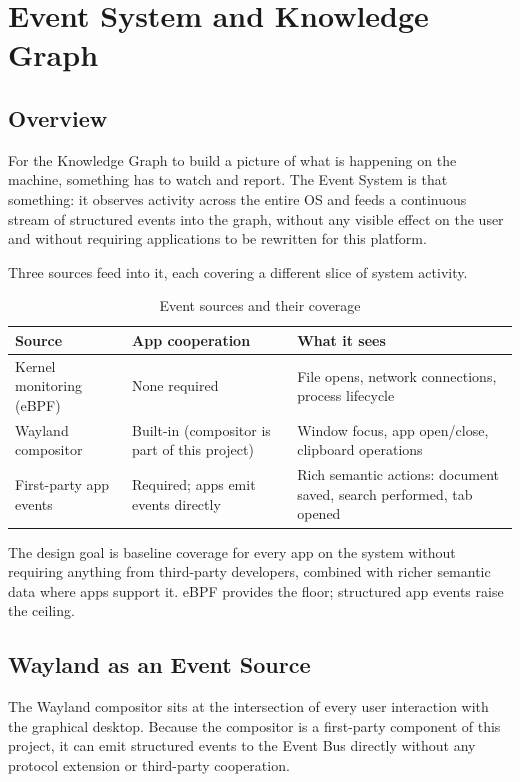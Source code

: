 \section{Event System and Knowledge Graph}
\label{sec:event-knowledge}

\subsection{Overview}
\label{sec:event-overview}

For the Knowledge Graph to build a picture of what is happening on the machine,
something has to watch and report. The Event System is that something: it
observes activity across the entire OS and feeds a continuous stream of
structured events into the graph, without any visible effect on the user and
without requiring applications to be rewritten for this platform.

Three sources feed into it, each covering a different slice of system activity.

\begin{table}[htbp]
\caption{Event sources and their coverage}
\label{tab:event-sources}
\begin{tabularx}{\linewidth}{lXX}
\toprule
\textbf{Source} & \textbf{App cooperation} & \textbf{What it sees} \\
\midrule
Kernel monitoring (eBPF) &
  None required &
  File opens, network connections, process lifecycle \\
Wayland compositor &
  Built-in (compositor is part of this project) &
  Window focus, app open/close, clipboard operations \\
First-party app events &
  Required; apps emit events directly &
  Rich semantic actions: document saved, search performed, tab opened \\
\bottomrule
\end{tabularx}
\end{table}

The design goal is baseline coverage for every app on the system without
requiring anything from third-party developers, combined with richer semantic
data where apps support it. eBPF provides the floor; structured app events
raise the ceiling.

\subsection{Wayland as an Event Source}
\label{sec:wayland-events}

The Wayland compositor sits at the intersection of every user interaction with
the graphical desktop. Because the compositor is a first-party component of
this project, it can emit structured events to the Event Bus directly without
any protocol extension or third-party cooperation.

